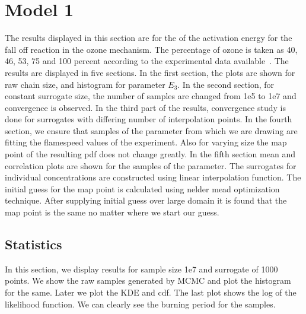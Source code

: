 \section{Model 1}

The results displayed in this section are for the
of the activation energy for the fall off reaction in the ozone
mechanism. The percentage of ozone is taken as 40, 46, 53, 75 and 100
percent according to the experimental data
available~\cite{Streng}. The results are displayed in five
sections. In the
first section, the plots are shown for raw chain size, and histogram
for parameter $E_3$. In the second section, for
constant surrogate size, the number of samples are changed from 1e5 to
1e7 and convergence is observed. In the third part of the results,
convergence study is done for surrogates with differing number of
interpolation points. In the
fourth section, we ensure that samples of the parameter from which we are
drawing are fitting the flamespeed values of the experiment. Also for
varying size the map point of the resulting pdf does not change
greatly. In the fifth section mean and correlation plots are shown for
the samples of the parameter. The surrogates for individual
concentrations are constructed using linear interpolation
function. The initial guess for the map point is calculated using
nelder mead optimization technique. After supplying initial guess over
large domain it is found that the map point is the same no matter
where we start our guess.

\subsection{ Statistics }

 In this section, we display results for sample size 1e7 and surrogate
 of 1000 points. We show the raw samples generated by MCMC and plot
 the histogram for the same. Later we plot the KDE and cdf. The last
 plot shows the log of the likelihood function. We can clearly see the
 burning period for the samples.

